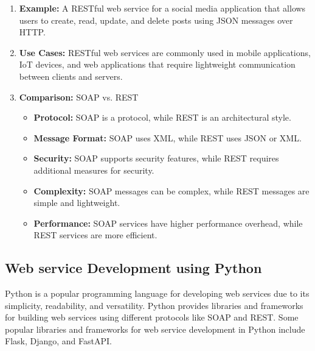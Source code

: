 \documentclass[11pt]{article}
\begin{document}
\begin{enumerate}
\begin{itemize}
          \end{itemize}
    \item \textbf{Example:} A RESTful web service for a social media application that allows users to create, read, update, and delete posts using JSON messages over HTTP.
    \item \textbf{Use Cases:} RESTful web services are commonly used in mobile applications, IoT devices, and web applications that require lightweight communication between clients and servers.
    \item \textbf{Comparison:} SOAP vs. REST
          \begin{itemize}
              \item \textbf{Protocol:} SOAP is a protocol, while REST is an architectural style.
              \item \textbf{Message Format:} SOAP uses XML, while REST uses JSON or XML.
              \item \textbf{Security:} SOAP supports security features, while REST requires additional measures for security.
              \item \textbf{Complexity:} SOAP messages can be complex, while REST messages are simple and lightweight.
              \item \textbf{Performance:} SOAP services have higher performance overhead, while REST services are more efficient.
          \end{itemize}
\end{enumerate}

\subsection{Web service Development using Python}

Python is a popular programming language for developing web services due to its simplicity, readability, and versatility. Python provides libraries and frameworks for building web services using different protocols like SOAP and REST. Some popular libraries and frameworks for web service development in Python include Flask, Django, and FastAPI.
\end{document}
